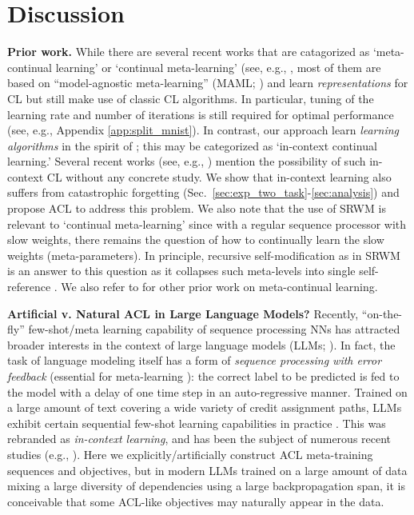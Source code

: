 \documentclass{article}
\begin{document}
\section{Discussion}
\label{sec:disc}

\textbf{Prior work.}
While there are several recent works that are catagorized as `meta-continual learning' or `continual meta-learning' (see, e.g., \citet{JavedW19,BeaulieuFMLSCC20,CacciaRONLPLRLV20,he2019task,yapRB21,munkhdalai2017meta},
most of them are based on ``model-agnostic meta-learning'' (MAML; \citet{FinnAL17,FinnL18}) and learn \textit{representations} for CL but still make use of classic CL algorithms.
In particular, tuning of the learning rate and number of iterations is still required for optimal performance (see, e.g., Appendix \ref{app:split_mnist}).
In contrast, our approach learn \textit{learning algorithms} in the spirit of \citet{hochreiter2001learning, younger1999fixed}; this may be categorized as `in-context continual learning.'
Several recent works (see, e.g., \citet{irie2023accelerating,coda2023meta,von2023uncovering}) mention the possibility of such in-context CL without any concrete study.
We show that in-context learning also suffers from catastrophic forgetting (Sec.~\ref{sec:exp_two_task}-\ref{sec:analysis})
and propose ACL to address this problem.
We also note that the use of SRWM is relevant to `continual meta-learning' since with a regular sequence processor with slow weights, there remains the question of how to continually learn the slow weights (meta-parameters). In principle, recursive self-modification as in SRWM is an answer to this question as it collapses such meta-levels into single self-reference \citep{Schmidhuber:92selfref}.
We also refer to \citet{Schmidhubermeta2,schmidhuber1995beyond,schmidhuber1997shifting} for other prior work on meta-continual learning.

\textbf{Artificial v. Natural ACL in Large Language Models?}
Recently, ``on-the-fly'' few-shot/meta learning capability of sequence processing NNs has attracted broader interests in the context of large language models (LLMs; \citet{gpt2}).
In fact, the task of language modeling itself has a form of \textit{sequence processing with error feedback} (essential for meta-learning \citep{schmidhuber1990making}): the correct label to be predicted is fed to the model with a delay of one time step in an auto-regressive manner.
Trained on a large amount of text covering a wide variety of credit assignment paths, LLMs exhibit certain sequential few-shot learning capabilities in practice \citep{gpt3}.
This was rebranded as \textit{in-context learning}, and
has been the subject of numerous recent studies (e.g., \citet{XieRL022, MinLHALHZ22, YooKKCJLLK22, chan2022data, chan2022transformers, kirsch2022general, akyurek2022learning, von2022transformers, dai2022can}).
Here we explicitly/artificially construct ACL meta-training sequences and objectives,
but in modern LLMs trained on a large amount of data mixing a large diversity of dependencies using a large backpropagation span, it is conceivable that some ACL-like objectives may naturally appear in the data.
\end{document}
